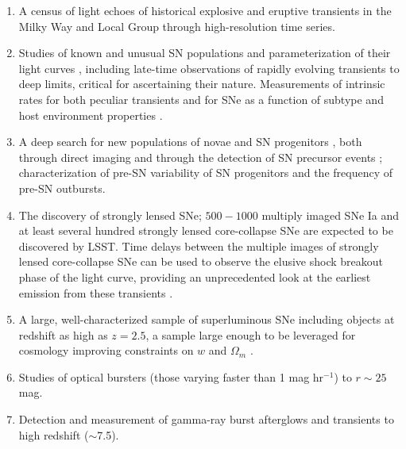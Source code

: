 \begin{enumerate}
\item A census of light echoes of historical explosive and eruptive
  transients in the Milky Way and Local Group through high-resolution
  time series.

\item Studies of known and unusual SN populations and parameterization of their light curves \citep[e.g.,][]{1998ApJ...495..617H,2003ApJ...590..944W,2007ApJ...667L..37H,2008ApJ...686..749K,2009ApJ...700.1097H,2012ApJ...748..127F,2014ApJS..213...19B,2017Natur.551..210A}, including late-time observations of rapidly evolving transients to deep limits, critical for ascertaining their nature. Measurements of intrinsic rates for both peculiar transients \cite[e.g.,][]{2014ApJ...794...23D} and for SNe as a function of subtype and host environment properties \citep[e.g., metallicity;][]{2017ApJ...837..120G}.

\item A deep search for new populations of novae and SN progenitors
      \citep[][see Figure~\ref{Fig:shri}]{2009ARA&A..47...63S,2009ApJ...705.1364T,2011MNRAS.415..773S},
      both through direct imaging and through the detection of SN precursor events \citep{2013Natur.494...65O};
      characterization of pre-SN variability of SN progenitors and the frequency of pre-SN outbursts.

\item The discovery of strongly lensed SNe; $500-1000$ multiply imaged SNe Ia \citep{2017ApJ...834L...5G,2018ApJ...855...22G}
and at least several hundred strongly lensed core-collapse SNe \citep{2010MNRAS.405.2579O}
are expected to be discovered by LSST. Time delays between the multiple images of strongly lensed core-collapse
SNe can be used to observe the elusive shock breakout phase of the light curve, providing an unprecedented look
at the earliest emission from these transients \citep{2018MNRAS.474.2612S}.

\item A large, well-characterized sample of superluminous SNe
including objects at redshift as high as $z=2.5$, a sample large enough to be leveraged for cosmology  improving constraints on $w$ and $\Omega_m$ \citep{2016MNRAS.456.1700S}.

\item Studies of optical bursters (those varying faster than 1 mag hr$^{-1}$) to $r\sim25$ mag.

\item Detection and measurement of gamma-ray burst afterglows and transients
      \cite[e.g.,][]{2004IJMPA..19.2385Z,2006ApJ...642..354Z,2010ApJ...720.1513K} to high redshift ($\sim$7.5).


\end{enumerate}

